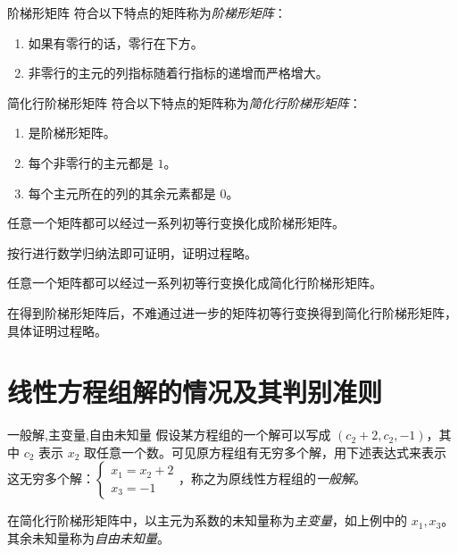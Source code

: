 \begin{definition}{阶梯形矩阵}
	符合以下特点的矩阵称为\emph{阶梯形矩阵}：
	\begin{enumerate}
		\item 如果有零行的话，零行在下方。
		\item 非零行的主元的列指标随着行指标的递增而严格增大。
	\end{enumerate}
\end{definition}

\begin{definition}{简化行阶梯形矩阵}
	符合以下特点的矩阵称为\emph{简化行阶梯形矩阵}：
	\begin{enumerate}
		\item 是阶梯形矩阵。
		\item 每个非零行的主元都是 $1$。
		\item 每个主元所在的列的其余元素都是 $0$。
	\end{enumerate}
\end{definition}

\begin{theorem}
	任意一个矩阵都可以经过一系列初等行变换化成阶梯形矩阵。
\end{theorem}

按行进行数学归纳法即可证明，证明过程略。

\begin{theorem}
	任意一个矩阵都可以经过一系列初等行变换化成简化行阶梯形矩阵。
\end{theorem}

在得到阶梯形矩阵后，不难通过进一步的矩阵初等行变换得到简化行阶梯形矩阵，具体证明过程略。

\section{线性方程组解的情况及其判别准则}

\begin{definition}{一般解,主变量,自由未知量}
	假设某方程组的一个解可以写成 $(c_2 + 2, c_2, -1)$，其中 $c_2$ 表示 $x_2$ 取任意一个数。可见原方程组有无穷多个解，用下述表达式来表示这无穷多个解：$\begin{cases} x_1 = x_2 + 2 \\ x_3 = -1 \end{cases}$，称之为原线性方程组的\emph{一般解}。

	在简化行阶梯形矩阵中，以主元为系数的未知量称为\emph{主变量}，如上例中的 $x_1, x_3$。其余未知量称为\emph{自由未知量}。
\end{definition}


